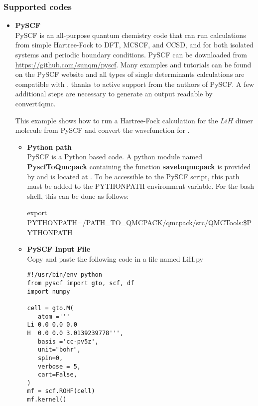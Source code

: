 \subsubsection{Supported codes}

\begin{itemize}
\item \textbf{PySCF}\\

PySCF\cite{Sun2018} is an all-purpose quantum chemistry code that can
run calculations from simple Hartree-Fock to DFT, MCSCF, and CCSD, and
for both isolated systems and periodic boundary conditions. PySCF can
be downloaded from \url{https://github.com/sunqm/pyscf}. Many examples
and tutorials can be found on the PySCF website and all types of
single determinants calculations are compatible with \qmcpack, thanks
to active support from the authors of PySCF. A few additional steps
are necessary to generate an output readable by convert4qmc.


This example shows how to run a Hartree-Fock calculation for the $LiH$
dimer molecule from PySCF and convert the wavefunction for \qmcpack.\\

\begin{itemize}
 \item \textbf{Python path}\\
PySCF is a Python based code. A python module named \textbf{PyscfToQmcpack} containing the function \textbf{savetoqmcpack} is provided by \qmcpack and is located at .
To be accessible to the PySCF script, this path must be added to the PYTHONPATH environment variable.
For the bash shell, this can be done as follows:\\
\begin{shade}
 export PYTHONPATH=/PATH_TO_QMCPACK/qmcpack/src/QMCTools:\$PYTHONPATH
\end{shade}


 \item \textbf{PySCF Input File}\\
 
Copy and paste the following code in a file named LiH.py

\begin{lstlisting}[style=Python]
#!/usr/bin/env python
from pyscf import gto, scf, df
import numpy

cell = gto.M(
   atom ='''
Li 0.0 0.0 0.0
H  0.0 0.0 3.0139239778''',
   basis ='cc-pv5z',
   unit="bohr",
   spin=0,
   verbose = 5,
   cart=False,
)
mf = scf.ROHF(cell)
mf.kernel()


\end{lstlisting}
\end{itemize}
\end{itemize}
